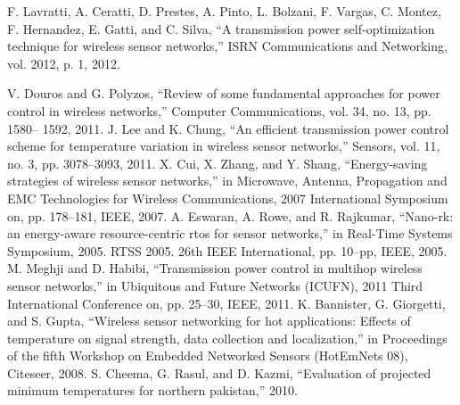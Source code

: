 \documentclass{article}
\begin{document}
\begin{thebibliography}{00}

 F. Lavratti, A. Ceratti, D. Prestes, A. Pinto, L. Bolzani, F. Vargas, C. Montez, F. Hernandez, E. Gatti, and C. Silva, “A transmission power self-optimization technique for wireless sensor networks,” ISRN Communications and Networking, vol. 2012, p. 1, 2012.
    
 V. Douros and G. Polyzos, “Review of some fundamental
approaches for power control in wireless networks,”
Computer Communications, vol. 34, no. 13, pp. 1580–
1592, 2011.
 J. Lee and K. Chung, “An efficient transmission power
control scheme for temperature variation in wireless sensor
networks,” Sensors, vol. 11, no. 3, pp. 3078–3093,
2011.
 X. Cui, X. Zhang, and Y. Shang, “Energy-saving strategies
of wireless sensor networks,” in Microwave, Antenna,
Propagation and EMC Technologies for Wireless
Communications, 2007 International Symposium on,
pp. 178–181, IEEE, 2007.
 A. Eswaran, A. Rowe, and R. Rajkumar, “Nano-rk: an
energy-aware resource-centric rtos for sensor networks,”
in Real-Time Systems Symposium, 2005. RTSS 2005. 26th
IEEE International, pp. 10–pp, IEEE, 2005.
 M. Meghji and D. Habibi, “Transmission power control
in multihop wireless sensor networks,” in Ubiquitous
and Future Networks (ICUFN), 2011 Third International
Conference on, pp. 25–30, IEEE, 2011.
 K. Bannister, G. Giorgetti, and S. Gupta, “Wireless sensor
networking for hot applications: Effects of temperature
on signal strength, data collection and localization,”
in Proceedings of the fifth Workshop on Embedded Networked
Sensors (HotEmNets 08), Citeseer, 2008.
 S. Cheema, G. Rasul, and D. Kazmi, “Evaluation of
projected minimum temperatures for northern pakistan,”
2010.
\end{thebibliography}
\end{document}
